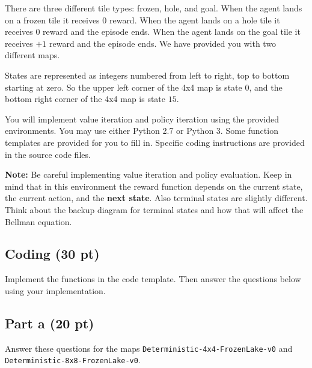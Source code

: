\documentclass[12pt]{article}
\begin{document}
There are three different tile types: frozen, hole, and goal. When the
agent lands on a frozen tile it receives $0$ reward. When the agent
lands on a hole tile it receives $0$ reward and the episode ends. When
the agent lands on the goal tile it receives $+1$ reward and the episode
ends. We have provided you with two different maps.

States are represented as integers numbered from left to right, top to
bottom starting at zero. So the upper left corner of the 4x4 map is
state $0$, and the bottom right corner of the 4x4 map is state $15$.

You will implement value iteration and policy iteration using the
provided environments. You may use either Python 2.7 or Python 3. Some
function templates are provided for you to fill in. Specific coding
instructions are provided in the source code files.

\textbf{Note:} Be careful implementing value iteration and policy
evaluation. Keep in mind that in this environment the reward function
depends on the current state, the current action, and the \textbf{next
state}. Also terminal states are slightly different. Think about the
backup diagram for terminal states and how that will affect the
Bellman equation.

\subsection*{Coding (30 pt)}

Implement the functions in the code template. Then answer the questions below
using your implementation.

\subsection*{Part a (20 pt)}

Answer these questions for the maps
\texttt{Deterministic-4x4-FrozenLake-v0} and \\
\texttt{Deterministic-8x8-FrozenLake-v0}.
\end{document}
